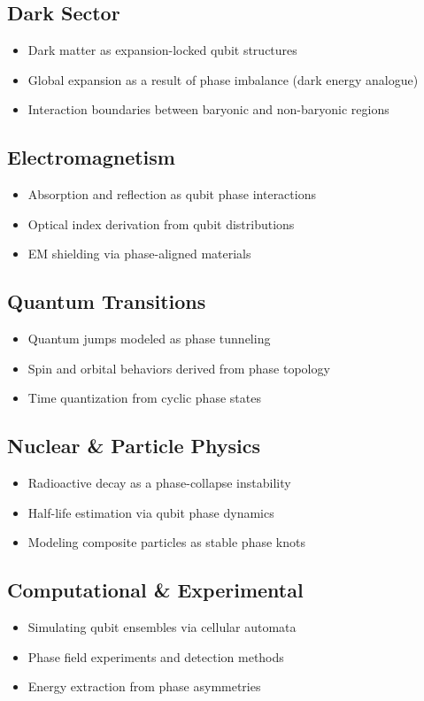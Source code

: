 \documentclass[12pt]{report} %
\begin{document}
\subsection{Dark Sector}
\begin{itemize}
  \item Dark matter as expansion-locked qubit structures  
  \item Global expansion as a result of phase imbalance (dark energy analogue)  
  \item Interaction boundaries between baryonic and non-baryonic regions  
\end{itemize}

\subsection{Electromagnetism}
\begin{itemize}
  \item Absorption and reflection as qubit phase interactions  
  \item Optical index derivation from qubit distributions  
  \item EM shielding via phase-aligned materials  
\end{itemize}

\subsection{Quantum Transitions}
\begin{itemize}
  \item Quantum jumps modeled as phase tunneling  
  \item Spin and orbital behaviors derived from phase topology  
  \item Time quantization from cyclic phase states  
\end{itemize}

\subsection{Nuclear \& Particle Physics}
\begin{itemize}
  \item Radioactive decay as a phase-collapse instability  
  \item Half-life estimation via qubit phase dynamics  
  \item Modeling composite particles as stable phase knots  
\end{itemize}

\subsection{Computational \& Experimental}
\begin{itemize}
  \item Simulating qubit ensembles via cellular automata  
  \item Phase field experiments and detection methods  
  \item Energy extraction from phase asymmetries  
\end{itemize}
\end{document}

